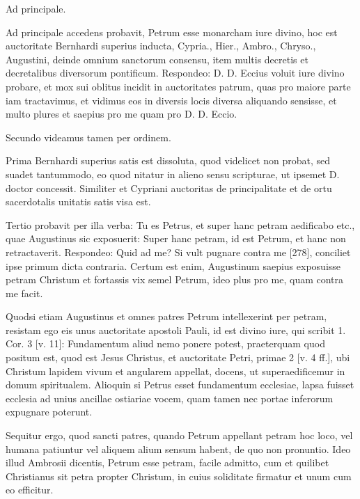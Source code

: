 Ad principale.

Ad principale accedens probavit, Petrum esse monarcham iure divino, hoc est auctoritate Bernhardi superius inducta, Cypria., Hier., Ambro., Chryso., Augustini, deinde omnium sanctorum consensu, item multis decretis et decretalibus diversorum pontificum. Respondeo: D. D. Eccius voluit iure divino probare, et mox sui oblitus incidit in auctoritates patrum, quas pro maiore parte iam tractavimus, et vidimus eos in diversis locis diversa aliquando sensisse, et multo plures et saepius pro me quam pro D. D. Eccio.

Secundo videamus tamen per ordinem.

Prima Bernhardi superius satis est dissoluta, quod videlicet non probat, sed suadet tantummodo, eo quod nitatur in alieno sensu scripturae, ut ipsemet D. doctor concessit. Similiter et Cypriani auctoritas de principalitate et de ortu sacerdotalis unitatis satis visa est.

Tertio probavit per illa verba: Tu es Petrus, et super hanc petram aedificabo etc., quae Augustinus sic exposuerit: Super hanc petram, id est Petrum, et hanc non retractaverit. Respondeo: Quid ad me? Si vult pugnare contra me [278], conciliet ipse primum dicta contraria. Certum est enim, Augustinum saepius exposuisse petram Christum et fortassis vix semel Petrum, ideo plus pro me, quam contra me facit.

Quodsi etiam Augustinus et omnes patres Petrum intellexerint per petram, resistam ego eis unus auctoritate apostoli Pauli, id est divino iure, qui scribit 1. Cor. 3 [v. 11]: Fundamentum aliud nemo ponere potest, praeterquam quod positum est, quod est Jesus Christus, et auctoritate Petri, primae 2 [v. 4 ff.], ubi Christum lapidem vivum et angularem appellat, docens, ut superaedificemur in domum spiritualem. Alioquin si Petrus esset fundamentum ecclesiae, lapsa fuisset ecclesia ad unius ancillae ostiariae vocem, quam tamen nec portae inferorum expugnare poterunt.

Sequitur ergo, quod sancti patres, quando Petrum appellant petram hoc loco, vel humana patiuntur vel aliquem alium sensum habent, de quo non pronuntio. Ideo illud Ambrosii dicentis, Petrum esse petram, facile admitto, cum et quilibet Christianus sit petra propter Christum, in cuius soliditate firmatur et unum cum eo efficitur.

